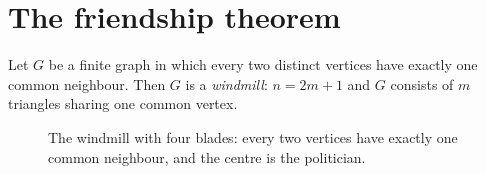 \section{The friendship theorem}

\begin{theorem}\label{linear:thm:friendship}
Let $G$ be a finite graph in which every two distinct vertices have exactly one common neighbour. Then $G$ is a
\emph{windmill}: $n=2m+1$ and $G$ consists of $m$ triangles sharing one common vertex.
\end{theorem}

\begin{figure}[ht]
\centering
{}
\caption{The windmill with four blades: every two vertices have exactly one common neighbour, and the centre is the
politician.}
\label{linear:fig:windmill}
\end{figure}

